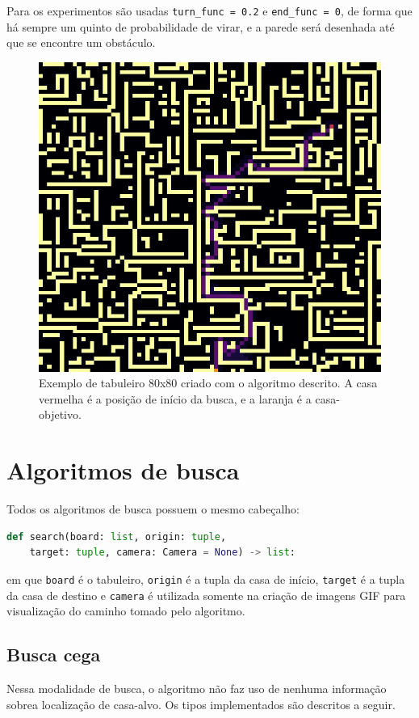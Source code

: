 \documentclass[12pt]{article}
\begin{document}
Para os experimentos são usadas \verb|turn_func = 0.2| e \verb|end_func = 0|, de forma que há sempre um quinto de probabilidade de virar, e a parede será desenhada até que se encontre um obstáculo.

\begin{figure}[h!]
	\centering
	\label{fig:trapezoidal}
	\includegraphics[width=.7\textwidth]{80x80}
	\caption{Exemplo de tabuleiro 80x80 criado com o algoritmo descrito. A casa vermelha é a posição de início da busca, e a laranja é a casa-objetivo.}
\end{figure}


\section{Algoritmos de busca}
Todos os algoritmos de busca possuem o mesmo cabeçalho:

\begin{lstlisting}[language=Python]
def search(board: list, origin: tuple,
	target: tuple, camera: Camera = None) -> list:
\end{lstlisting}

em que \verb|board| é o tabuleiro, \verb|origin| é a tupla da casa de início, \verb|target| é a tupla da casa de destino e \verb|camera| é utilizada somente na criação de imagens GIF para visualização do caminho tomado pelo algoritmo.

\subsection{Busca cega}
Nessa modalidade de busca, o algoritmo não faz uso de nenhuma informação sobrea localização de casa-alvo. Os tipos implementados são descritos a seguir.
\end{document}

